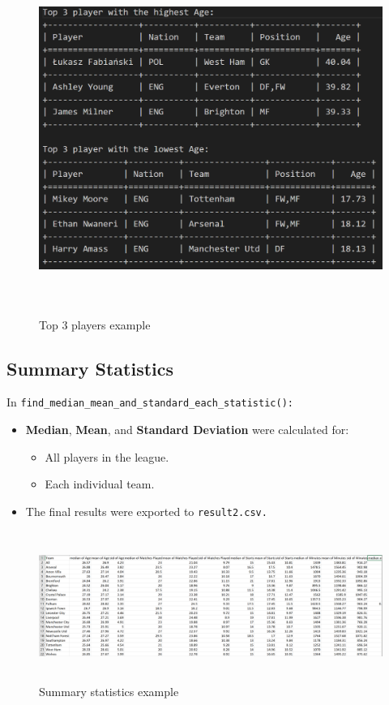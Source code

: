 \documentclass[12pt,a4paper]{report}
\begin{document}
\begin{figure}[H]
    \centering
    \includegraphics[width=6.5in,height=4.5in]{media/image14.png}
    \caption{Top 3 players example}
\end{figure}

\subsection{Summary Statistics}
In \texttt{find\_median\_mean\_and\_standard\_each\_statistic():}
\begin{itemize}
    \item \textbf{Median}, \textbf{Mean}, and \textbf{Standard Deviation} were calculated for:
    \begin{itemize}
        \item All players in the league.
        \item Each individual team.
    \end{itemize}
    \item The final results were exported to \texttt{result2.csv.}
\end{itemize}

\begin{figure}[H]
    \centering
    \includegraphics[width=6.5in,height=1.9166666666666667in]{media/image4.png}
    \caption{Summary statistics example}
\end{figure}
\end{document}

